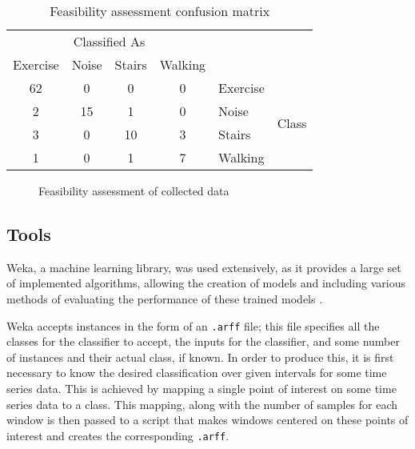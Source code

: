\begin{table}
	\centering
	\begin{tabular}{|cccc|ll|}
		\hline
		\multicolumn{4}{|c|}{Classified As}   &          &                        \\
		Exercise & Noise & Stairs & Walking &          &                        \\
		\hline
		62       & 0     & 0      & 0       & Exercise & \multirow{4}{*}{Class} \\
		2        & 15    & 1      & 0       & Noise    &                        \\
		3        & 0     & 10     & 3       & Stairs   &                        \\
		1        & 0     & 1      & 7       & Walking  &                       \\
		\hline
	\end{tabular}
	\caption{Feasibility assessment confusion matrix \label{tab:first-confusion}}
\end{table}

\begin{figure}
	\centering
	\caption{Feasibility assessment of collected data \label{fig:first-data}}
\end{figure}


\subsection{Tools \label{sec:tools}}
Weka, a machine learning library, was used extensively, as it provides a large set of implemented algorithms, allowing the creation of models and including various methods of evaluating the performance of these trained models \cite{holmes1994weka}.

Weka accepts instances in the form of an \texttt{.arff} file; this file specifies all the classes for the classifier to accept, the inputs for the classifier, and some number of instances and their actual class, if known. In order to produce this, it is first necessary to know the desired classification over given intervals for some time series data. This is achieved by mapping a single point of interest on some time series data to a class. This mapping, along with the number of samples for each window is then passed to a script that makes windows centered on these points of interest and creates the corresponding \texttt{.arff}.

